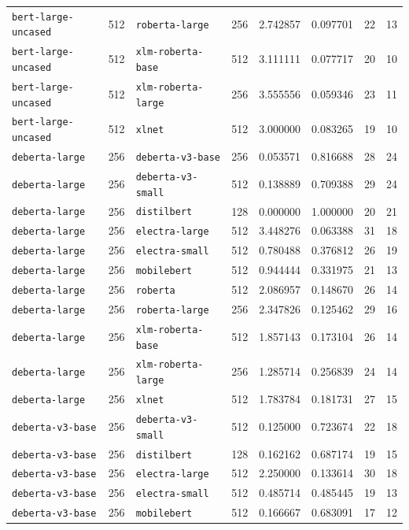 \documentclass[11pt]{article}
\begin{document}
\begin{landscape}
\begin{longtable}{llllcccc}
\texttt{bert-large-uncased} & 512 & \texttt{roberta-large} & 256 & 2.742857 & 0.097701 & 22 & 13 \\
\texttt{bert-large-uncased} & 512 & \texttt{xlm-roberta-base} & 512 & 3.111111 & 0.077717 & 20 & 10 \\
\texttt{bert-large-uncased} & 512 & \texttt{xlm-roberta-large} & 256 & 3.555556 & 0.059346 & 23 & 11 \\
\texttt{bert-large-uncased} & 512 & \texttt{xlnet} & 512 & 3.000000 & 0.083265 & 19 & 10 \\
\texttt{deberta-large} & 256 & \texttt{deberta-v3-base} & 256 & 0.053571 & 0.816688 & 28 & 24 \\
\texttt{deberta-large} & 256 & \texttt{deberta-v3-small} & 512 & 0.138889 & 0.709388 & 29 & 24 \\
\texttt{deberta-large} & 256 & \texttt{distilbert} & 128 & 0.000000 & 1.000000 & 20 & 21 \\
\texttt{deberta-large} & 256 & \texttt{electra-large} & 512 & 3.448276 & 0.063388 & 31 & 18 \\
\texttt{deberta-large} & 256 & \texttt{electra-small} & 512 & 0.780488 & 0.376812 & 26 & 19 \\
\texttt{deberta-large} & 256 & \texttt{mobilebert} & 512 & 0.944444 & 0.331975 & 21 & 13 \\
\texttt{deberta-large} & 256 & \texttt{roberta} & 512 & 2.086957 & 0.148670 & 26 & 14 \\
\texttt{deberta-large} & 256 & \texttt{roberta-large} & 256 & 2.347826 & 0.125462 & 29 & 16 \\
\texttt{deberta-large} & 256 & \texttt{xlm-roberta-base} & 512 & 1.857143 & 0.173104 & 26 & 14 \\
\texttt{deberta-large} & 256 & \texttt{xlm-roberta-large} & 256 & 1.285714 & 0.256839 & 24 & 14 \\
\texttt{deberta-large} & 256 & \texttt{xlnet} & 512 & 1.783784 & 0.181731 & 27 & 15 \\
\texttt{deberta-v3-base} & 256 & \texttt{deberta-v3-small} & 512 & 0.125000 & 0.723674 & 22 & 18 \\
\texttt{deberta-v3-base} & 256 & \texttt{distilbert} & 128 & 0.162162 & 0.687174 & 19 & 15 \\
\texttt{deberta-v3-base} & 256 & \texttt{electra-large} & 512 & 2.250000 & 0.133614 & 30 & 18 \\
\texttt{deberta-v3-base} & 256 & \texttt{electra-small} & 512 & 0.485714 & 0.485445 & 19 & 13 \\
\texttt{deberta-v3-base} & 256 & \texttt{mobilebert} & 512 & 0.166667 & 0.683091 & 17 & 12 \\

\end{longtable}
\end{landscape}
\end{document}
